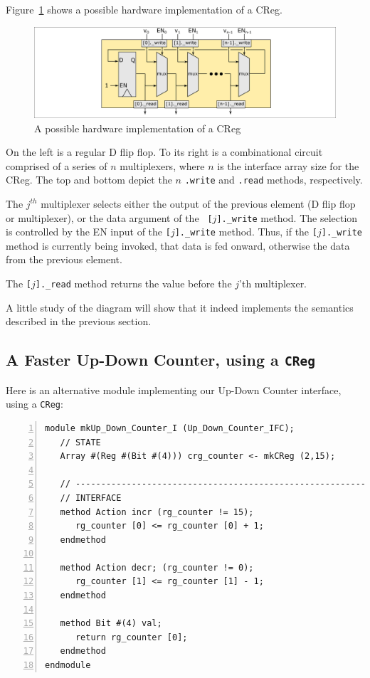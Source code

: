 Figure~\ref{Fig_CReg_HW} shows a possible hardware implementation of a CReg.
\begin{figure}[htbp]
  \centerline{\includegraphics[width=6in,angle=0]{Figures/Fig_CReg_HW}}
  \caption{\label{Fig_CReg_HW} A possible hardware implementation of a CReg}
\end{figure}
On the left is a regular D flip flop.  To its right is a combinational
circuit comprised of a series of $n$ multiplexers, where $n$ is the
interface array size for the CReg.  The top and bottom depict the $n$
\verb|.write| and \verb|.read| methods, respectively.

The $j^{th}$ multiplexer selects either the output of the previous
element (D flip flop or multiplexer), or the data argument of the {\tt
[$j$].\_write} method.  The selection is controlled by the EN input of
the {\tt [$j$].\_write} method.  Thus, if the {\tt [$j$].\_write} method
is currently being invoked, that data is fed onward, otherwise the
data from the previous element.

The {\tt [$j$].\_read} method returns the value before the $j$'th
multiplexer.

A little study of the diagram will show that it indeed implements the
semantics described in the previous section.


\subsection{A Faster Up-Down Counter, using a {\tt CReg}}

\label{Sec_Faster_Up_Down_Counter}

Here is an alternative module implementing our Up-Down Counter
interface, using a \verb|CReg|:

{\footnotesize
\begin{Verbatim}[frame=single, numbers=left]
module mkUp_Down_Counter_I (Up_Down_Counter_IFC);
   // STATE
   Array #(Reg #(Bit #(4))) crg_counter <- mkCReg (2,15);

   // ----------------------------------------------------------------
   // INTERFACE
   method Action incr (rg_counter != 15);
      rg_counter [0] <= rg_counter [0] + 1;
   endmethod

   method Action decr; (rg_counter != 0);
      rg_counter [1] <= rg_counter [1] - 1;
   endmethod

   method Bit #(4) val;
      return rg_counter [0];
   endmethod
endmodule
\end{Verbatim}
}

